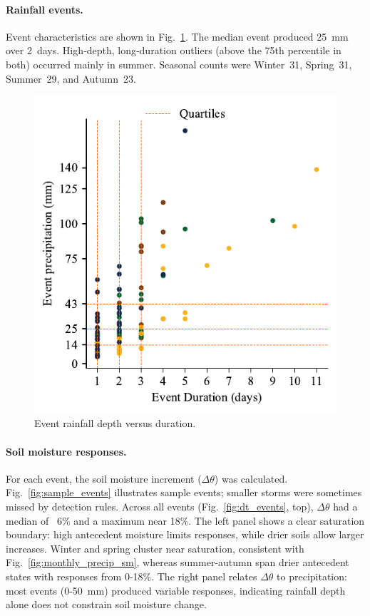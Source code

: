 \documentclass[twocolumn]{article}
\begin{document}
\paragraph{Rainfall events.}
Event characteristics are shown in Fig.~\ref{fig:rain_events}. The median event produced 25~mm over 2~days. High‐depth, long‐duration outliers (above the 75th percentile in both) occurred mainly in summer. Seasonal counts were Winter~31, Spring~31, Summer~29, and Autumn~23.

\begin{figure}[!h]
    \centering
    \includegraphics[width=0.75\columnwidth]{rain events}
    \caption{Event rainfall depth versus duration.}
    \label{fig:rain_events}
\end{figure}

\paragraph{Soil moisture responses.}

For each event, the soil moisture increment ($\Delta \theta$) was calculated. Fig.~\ref{fig:sample_events} illustrates sample events; smaller storms were sometimes missed by detection rules. Across all events (Fig.~\ref{fig:dt_events}, top), $\Delta \theta$ had a median of ~6\% and a maximum near 18\%. The left panel shows a clear saturation boundary: high antecedent moisture limits responses, while drier soils allow larger increases. Winter and spring cluster near saturation, consistent with Fig.~\ref{fig:monthly_precip_sm}, whereas summer-autumn span drier antecedent states with responses from 0-18\%. The right panel relates $\Delta \theta$ to precipitation: most events (0-50~mm) produced variable responses, indicating rainfall depth alone does not constrain soil moisture change.
\end{document}
